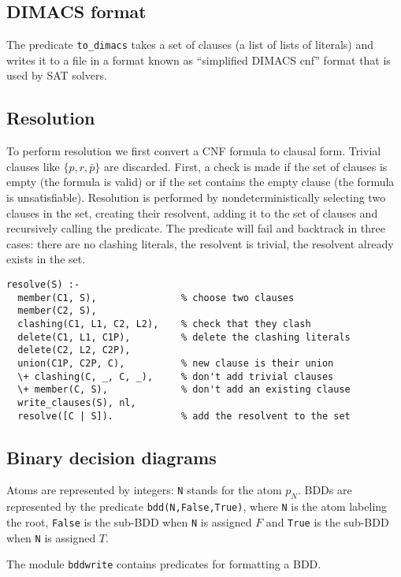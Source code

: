 \documentclass[11pt]{article}
\newcommand*{\p}[1]{\textup{\texttt{#1}}}
\begin{document}
\subsection{DIMACS format}

The predicate \p{to\_dimacs} takes a set of clauses (a list of lists of
literals) and writes it to a file in a format known as ``simplified
DIMACS cnf'' format that is used by SAT solvers.


\subsection{Resolution}\label{s.resprop}

To perform resolution we first convert a CNF formula to clausal form.
Trivial clauses like $\{p,r,\bar{p}\}$ are discarded. First, a check is
made if the set of clauses is empty (the formula is valid) or if the set
contains the empty clause (the formula is unsatisfiable). Resolution is
performed by nondeterministically selecting two clauses in the set,
creating their resolvent, adding it to the set of clauses and
recursively calling the predicate. The predicate will fail and backtrack
in three cases: there are no clashing literals, the resolvent is
trivial, the resolvent already exists in the set.

\begin{verbatim}
resolve(S) :-
  member(C1, S),               % choose two clauses
  member(C2, S),               
  clashing(C1, L1, C2, L2),    % check that they clash
  delete(C1, L1, C1P),         % delete the clashing literals
  delete(C2, L2, C2P),         
  union(C1P, C2P, C),          % new clause is their union
  \+ clashing(C, _, C, _),     % don't add trivial clauses
  \+ member(C, S),             % don't add an existing clause
  write_clauses(S), nl,        
  resolve([C | S]).            % add the resolvent to the set
\end{verbatim}


\subsection{Binary decision diagrams}\label{s.bdd}

Atoms are represented by integers: \p{N} stands for the atom $p_{N}$.
BDDs are represented by the predicate \p{bdd(N,False,True)}, where \p{N}
is the atom labeling the root, \p{False} is the sub-BDD when \p{N} is
assigned $F$ and \p{True} is the sub-BDD when \p{N} is assigned $T$.

The module \p{bddwrite} contains predicates for formatting a BDD.
\end{document}
